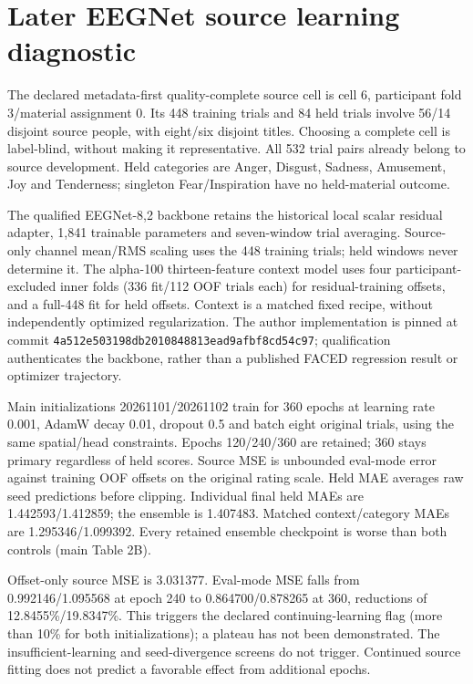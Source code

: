 \documentclass[10pt,a4paper]{article}
\begin{document}
\section{Later EEGNet source learning diagnostic}
The declared metadata-first quality-complete source cell is cell 6, participant fold 3/material assignment 0. Its 448 training trials and 84 held trials involve 56/14 disjoint source people, with eight/six disjoint titles. Choosing a complete cell is label-blind, without making it representative. All 532 trial pairs already belong to source development. Held categories are Anger, Disgust, Sadness, Amusement, Joy and Tenderness; singleton Fear/Inspiration have no held-material outcome.

The qualified EEGNet-8,2 backbone retains the historical local scalar residual adapter, 1,841 trainable parameters and seven-window trial averaging. Source-only channel mean/RMS scaling uses the 448 training trials; held windows never determine it. The alpha-100 thirteen-feature context model uses four participant-excluded inner folds (336 fit/112 OOF trials each) for residual-training offsets, and a full-448 fit for held offsets. Context is a matched fixed recipe, without independently optimized regularization. The author implementation is pinned at commit \texttt{4a512e503198db2010848813ead9afbf8cd54c97}; qualification authenticates the backbone, rather than a published FACED regression result or optimizer trajectory.

Main initializations 20261101/20261102 train for 360 epochs at learning rate 0.001, AdamW decay 0.01, dropout 0.5 and batch eight original trials, using the same spatial/head constraints. Epochs 120/240/360 are retained; 360 stays primary regardless of held scores. Source MSE is unbounded eval-mode error against training OOF offsets on the original rating scale. Held MAE averages raw seed predictions before clipping. Individual final held MAEs are 1.442593/1.412859; the ensemble is 1.407483. Matched context/category MAEs are 1.295346/1.099392. Every retained ensemble checkpoint is worse than both controls (main Table 2B).

Offset-only source MSE is 3.031377. Eval-mode MSE falls from 0.992146/1.095568 at epoch 240 to 0.864700/0.878265 at 360, reductions of 12.8455\%/19.8347\%. This triggers the declared continuing-learning flag (more than 10\% for both initializations); a plateau has not been demonstrated. The insufficient-learning and seed-divergence screens do not trigger. Continued source fitting does not predict a favorable effect from additional epochs.
\end{document}
